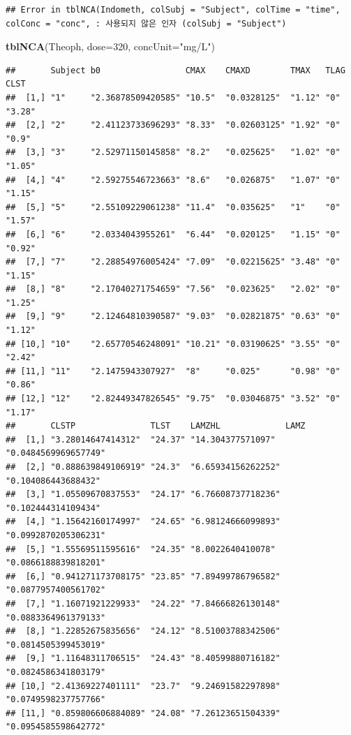 \documentclass[]{krantz}
\makeatletter
\newenvironment{Shaded}{\begin{snugshade}}{\end{snugshade}}
\newcommand{\KeywordTok}[1]{\textcolor[rgb]{0.13,0.29,0.53}{\textbf{#1}}}
\newcommand{\DataTypeTok}[1]{\textcolor[rgb]{0.13,0.29,0.53}{#1}}
\newcommand{\DecValTok}[1]{\textcolor[rgb]{0.00,0.00,0.81}{#1}}
\newcommand{\StringTok}[1]{\textcolor[rgb]{0.31,0.60,0.02}{#1}}
\newcommand{\NormalTok}[1]{#1}
\newenvironment{kframe}{%
\medskip{}
\setlength{\fboxsep}{.8em}
 \def\at@end@of@kframe{}%
 \ifinner\ifhmode%
  \def\at@end@of@kframe{\end{minipage}}%
  \begin{minipage}{\columnwidth}%
 \fi\fi%
 \def\FrameCommand##1{\hskip\@totalleftmargin \hskip-\fboxsep
 \colorbox{shadecolor}{##1}\hskip-\fboxsep
     \hskip-\linewidth \hskip-\@totalleftmargin \hskip\columnwidth}%
 \MakeFramed {\advance\hsize-\width
   \@totalleftmargin\z@ \linewidth\hsize
   \@setminipage}}%
 {\par\unskip\endMakeFramed%
 \at@end@of@kframe}
\renewenvironment{Shaded}{\begin{kframe}}{\end{kframe}}
\theoremstyle{definition}
\theoremstyle{definition}
\theoremstyle{definition}
\theoremstyle{remark}
\makeatother
\begin{document}
\begin{verbatim}
## Error in tblNCA(Indometh, colSubj = "Subject", colTime = "time", colConc = "conc", : 사용되지 않은 인자 (colSubj = "Subject")
\end{verbatim}

\begin{Shaded}
\begin{Highlighting}[]
\KeywordTok{tblNCA}\NormalTok{(Theoph, }\DataTypeTok{dose=}\DecValTok{320}\NormalTok{, }\DataTypeTok{concUnit=}\StringTok{"mg/L"}\NormalTok{)}
\end{Highlighting}
\end{Shaded}

\begin{verbatim}
##       Subject b0                 CMAX    CMAXD        TMAX   TLAG CLST  
##  [1,] "1"     "2.36878509420585" "10.5"  "0.0328125"  "1.12" "0"  "3.28"
##  [2,] "2"     "2.41123733696293" "8.33"  "0.02603125" "1.92" "0"  "0.9" 
##  [3,] "3"     "2.52971150145858" "8.2"   "0.025625"   "1.02" "0"  "1.05"
##  [4,] "4"     "2.59275546723663" "8.6"   "0.026875"   "1.07" "0"  "1.15"
##  [5,] "5"     "2.55109229061238" "11.4"  "0.035625"   "1"    "0"  "1.57"
##  [6,] "6"     "2.0334043955261"  "6.44"  "0.020125"   "1.15" "0"  "0.92"
##  [7,] "7"     "2.28854976005424" "7.09"  "0.02215625" "3.48" "0"  "1.15"
##  [8,] "8"     "2.17040271754659" "7.56"  "0.023625"   "2.02" "0"  "1.25"
##  [9,] "9"     "2.12464810390587" "9.03"  "0.02821875" "0.63" "0"  "1.12"
## [10,] "10"    "2.65770546248091" "10.21" "0.03190625" "3.55" "0"  "2.42"
## [11,] "11"    "2.1475943307927"  "8"     "0.025"      "0.98" "0"  "0.86"
## [12,] "12"    "2.82449347826545" "9.75"  "0.03046875" "3.52" "0"  "1.17"
##       CLSTP               TLST    LAMZHL             LAMZ                
##  [1,] "3.28014647414312"  "24.37" "14.304377571097"  "0.0484569969657749"
##  [2,] "0.888639849106919" "24.3"  "6.65934156262252" "0.104086443688432" 
##  [3,] "1.05509670837553"  "24.17" "6.76608737718236" "0.102444314109434" 
##  [4,] "1.15642160174997"  "24.65" "6.98124666099893" "0.0992870205306231"
##  [5,] "1.55569511595616"  "24.35" "8.0022640410078"  "0.0866188839818201"
##  [6,] "0.941271173708175" "23.85" "7.89499786796582" "0.0877957400561702"
##  [7,] "1.16071921229933"  "24.22" "7.84666826130148" "0.0883364961379133"
##  [8,] "1.22852675835656"  "24.12" "8.51003788342506" "0.0814505399453019"
##  [9,] "1.11648311706515"  "24.43" "8.40599880716182" "0.0824586341803179"
## [10,] "2.41369227401111"  "23.7"  "9.24691582297898" "0.0749598237757766"
## [11,] "0.859806606884089" "24.08" "7.26123651504339" "0.0954585598642772"

\end{verbatim}
\end{document}
